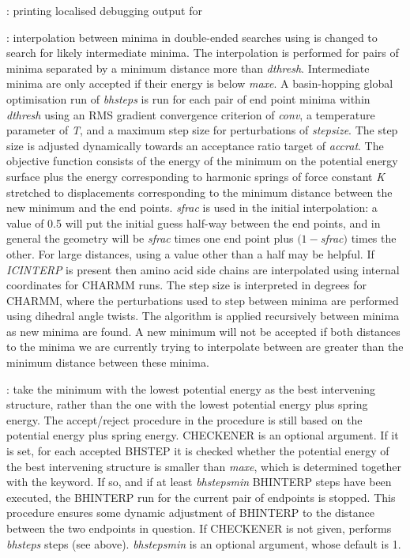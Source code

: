 {{: printing localised debugging output for {}
 
: interpolation
between minima in double-ended searches using  is changed to search
for likely intermediate minima. The interpolation is performed for pairs of minima
separated by a minimum distance more than {\it dthresh\/}. 
Intermediate minima are only accepted if their energy is below {\it maxe}.
A basin-hopping global optimisation run of {\it bhsteps} is run for each pair of
end point minima within {\it dthresh\/} using an RMS gradient convergence criterion
of {\it conv\/}, a temperature parameter of {\it T\/}, and a maximum step size for
perturbations of {\it stepsize\/}. The step size is adjusted dynamically towards an
acceptance ratio target of {\it accrat\/}. 
The objective function consists of the energy of the minimum on the potential energy surface
plus the energy corresponding to harmonic springs of force constant {\it K\/}
stretched to displacements corresponding to the minimum distance between the new minimum
and the end points.
{\it sfrac\/} is used in the initial interpolation: a value of 0.5 will put the initial
guess half-way between the end points, and in general the geometry will be {\it sfrac\/} times one 
end point plus $(1-${\it sfrac\/}$)$ times the other. 
For large distances, using a value other than a half may be helpful.
If {\it ICINTERP\/} is present then amino acid side chains are interpolated using
internal coordinates for CHARMM runs.
The step size is interpreted in degrees for CHARMM, where the perturbations used 
to step between minima are performed using dihedral angle twists.
The algorithm is applied recursively between minima as new minima are found.
A new minimum will not be accepted if both distances to the minima we are
currently trying to interpolate between are greater than the minimum distance
between these minima.

: take the minimum with the lowest potential energy
as the best intervening structure, rather than the one with the lowest potential energy
plus spring energy. The accept/reject procedure in the {} procedure
is still based on the potential energy plus spring energy.
CHECKENER is an optional argument. If it is set, for each accepted BHSTEP it is checked whether
the potential energy of the best intervening structure is smaller than {\it maxe}, which
is determined together with the {} keyword.  
If so, and if at least {\it bhstepsmin} BHINTERP steps have been executed,
the BHINTERP run for the current pair of endpoints is stopped.
This procedure ensures some dynamic adjustment of BHINTERP to the distance between the 
two endpoints in question. If CHECKENER is not given, {} performs
{\it bhsteps} steps (see above). {\it bhstepsmin} is an optional argument, whose default is 1. 

}}
